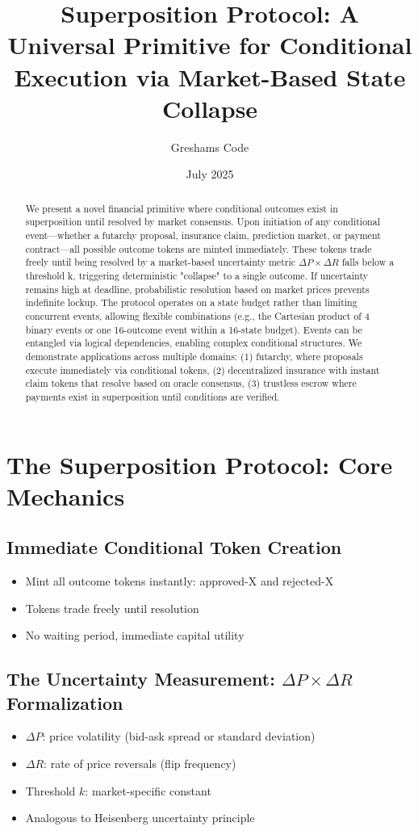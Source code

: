 \documentclass{article}
\title{Superposition Protocol: A Universal Primitive for Conditional Execution via Market-Based State Collapse}
\author[1]{Greshams Code}
\affil[1]{Founder, \href{https://govex.ai}{Govex.ai}}
\date{July 2025}
\begin{document}
\maketitle

\begin{abstract}
We present a novel financial primitive where conditional outcomes exist in superposition until resolved by market consensus. Upon initiation of any conditional event—whether a futarchy proposal, insurance claim, prediction market, or payment contract—all possible outcome tokens are minted immediately. These tokens trade freely until being resolved by a market-based uncertainty metric $\Delta P \times \Delta R$ falls below a threshold k, triggering deterministic "collapse" to a single outcome. If uncertainty remains high at deadline, probabilistic resolution based on market prices prevents indefinite lockup.
The protocol operates on a state budget rather than limiting concurrent events, allowing flexible combinations (e.g., the Cartesian product of 4 binary events or one 16-outcome event within a 16-state budget). Events can be entangled via logical dependencies, enabling complex conditional structures.
We demonstrate applications across multiple domains: (1) futarchy, where proposals execute immediately via conditional tokens, (2) decentralized insurance with instant claim tokens that resolve based on oracle consensus, (3) trustless escrow where payments exist in superposition until conditions are verified.
\end{abstract}


\section{The Superposition Protocol: Core Mechanics}
\subsection{Immediate Conditional Token Creation}
\begin{itemize}
   \item Mint all outcome tokens instantly: approved-X and rejected-X
   \item Tokens trade freely until resolution
   \item No waiting period, immediate capital utility
\end{itemize}

\subsection{The Uncertainty Measurement: $\Delta P \times \Delta R$ Formalization}
\begin{itemize}
   \item $\Delta P$: price volatility (bid-ask spread or standard deviation)
   \item $\Delta R$: rate of price reversals (flip frequency)
   \item Threshold $k$: market-specific constant
   \item Analogous to Heisenberg uncertainty principle
\end{itemize}
\end{document}

